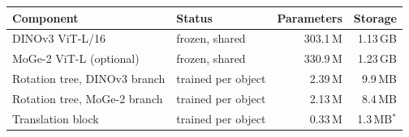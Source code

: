 \begin{tabular}{@{}l l r r@{}}
\toprule
Component & Status & Parameters & Storage \\
\midrule
DINOv3 ViT-L/16 & frozen, shared & 303.1\,M & 1.13\,GB \\
MoGe-2 ViT-L (optional) & frozen, shared & 330.9\,M & 1.23\,GB \\
\midrule
Rotation tree, DINOv3 branch & trained per object & 2.39\,M & 9.9\,MB \\
Rotation tree, MoGe-2 branch & trained per object & 2.13\,M & 8.4\,MB \\
Translation block & trained per object & 0.33\,M & 1.3\,MB$^*$ \\
\bottomrule
\end{tabular}